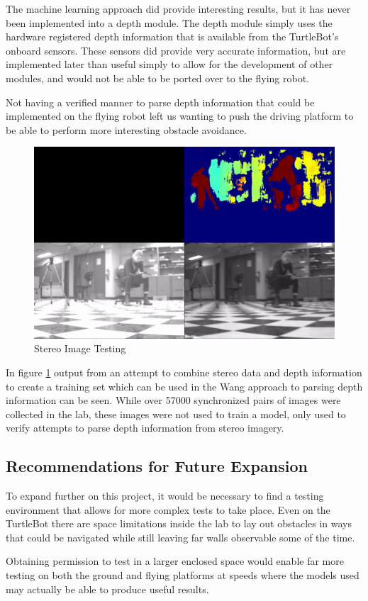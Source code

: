 \documentclass{article}[12]
\begin{document}
The machine learning approach did provide interesting results, but it has never been implemented into a depth module. The depth module simply uses the hardware registered depth information that is available from the TurtleBot's onboard sensors. These sensors did provide very accurate information, but are implemented later than useful simply to allow for the development of other modules, and would not be able to be ported over to the flying robot. 

Not having a verified manner to parse depth information that could be implemented on the flying robot left us wanting to push the driving platform to be able to perform more interesting obstacle avoidance.

\begin{figure}[H]
	\centering
	\includegraphics[width=0.6\linewidth]{stereo}
	\caption{Stereo Image Testing}
	\label{fig:stereostereo}
\end{figure}

In figure \ref{fig:stereostereo} output from an attempt to combine stereo data and depth information to create a training set which can be used in the Wang \cite{Wang_2018_CVPR} approach to parsing depth information can be seen. While over 57000 synchronized pairs of images were collected in the lab, these images were not used to train a model, only used to verify attempts to parse depth information from stereo imagery.

\subsection{Recommendations for Future Expansion}

To expand further on this project, it would be necessary to find a testing environment that allows for more complex tests to take place. Even on the TurtleBot there are space limitations inside the lab to lay out obstacles in ways that could be navigated while still leaving far walls observable some of the time. 

Obtaining permission to test in a larger enclosed space would enable far more testing on both the ground and flying platforms at speeds where the models used may actually be able to produce useful results. 
\end{document}

